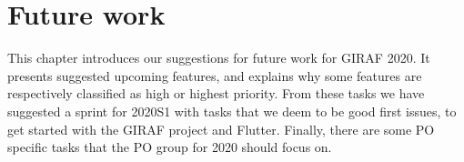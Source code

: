 \chapter{Future work}
This chapter introduces our suggestions for future work for GIRAF 2020. 
It presents suggested upcoming features, and explains why some features are respectively classified as high or highest priority.
From these tasks we have suggested a sprint for 2020S1 with tasks that we deem to be good first issues, to get started with the GIRAF project and Flutter.
Finally, there are some PO specific tasks that the PO group for 2020 should focus on.



